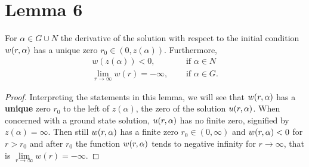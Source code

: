 \section{Lemma 6}
\begin{lemma}\label{wq}
For $\alpha\in G\cup N$ the derivative of the solution with respect to the initial condition $w(r,\alpha)$ has a unique zero $r_0\in(0,z(\alpha)).$ Furthermore, 
\begin{align*}
w(z(\alpha))<0,\quad&\text{ if }\alpha\in N\\
\underset{r\to\infty}{\lim}w(r)=-\infty,\quad&\text{ if }\alpha\in G.
\end{align*}

\begin{proof}
Interpreting the statements in this lemma, we will see that $w(r,\alpha)$ has a \textbf{unique} zero $r_0$ to the left of $z(\alpha)$, the zero of the solution $u(r,\alpha)$. When concerned with a ground state solution, $u(r,\alpha)$ has no finite zero, signified by $z(\alpha)=\infty$. Then still $w(r,\alpha)$ has a finite zero $r_0\in(0,\infty)$ and $w(r,\alpha)<0$ for $r>r_0$ and after $r_0$ the function $w(r,\alpha)$ tends to negative infinity for $r\to\infty$, that is $\underset{r\to\infty}{\lim}w(r)=-\infty$.


\end{proof}
\end{lemma}
